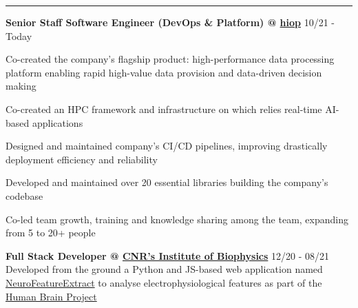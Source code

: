 \documentclass[11pt,letterpaper]{article}
\begin{document}
\begin{justify}
      \hrule
      \begin{itemize}[label={}, leftmargin=0pt]
            \begin{item}
                  \textbf{Senior Staff Software Engineer (DevOps \& Platform) @ \href{https://hiop.io/}{hiop}}
                  \hfill
                  \small{10/21 - Today}
                  \vspace{-0.15cm}
                  \begin{itemize}[label={$\bullet$}, leftmargin=12.5pt, noitemsep]
                        \begin{item}
                              Co-created the company's flagship product: high-performance data processing platform enabling rapid high-value data provision and data-driven decision making
                        \end{item}
                        \begin{item}
                              Co-created an HPC framework and infrastructure on which relies real-time AI-based applications
                        \end{item}
                        \begin{item}
                              Designed and maintained company's CI/CD pipelines, improving drastically deployment efficiency and reliability
                        \end{item}
                        \begin{item}
                              Developed and maintained over 20 essential libraries building the company's codebase
                        \end{item}
                        \begin{item}
                              Co-led team growth, training and knowledge sharing among the team, expanding from 5 to 20+ people
                        \end{item}
                  \end{itemize}
            \end{item}
            \begin{item}
                  \textbf{Full Stack Developer @ \href{https://www.ibf.cnr.it}{CNR’s Institute of Biophysics}}
                  \hfill
                  \small{12/20 - 08/21}
                  \\
                  Developed from the ground a Python and JS-based web application named \href{https://hhnb.ebrains-italy.eu/efelg/}{NeuroFeatureExtract} to analyse electrophysiological features as part of the \href{https://www.humanbrainproject.eu/en/}{Human Brain Project}

\end{item}
\end{itemize}
\end{justify}
\end{document}
